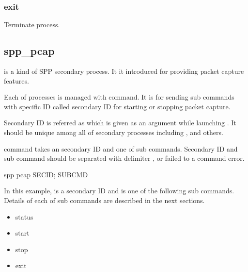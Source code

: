 \documentclass[a4paper,11pt,openany,oneside,english]{sphinxmanual}
\begin{document}
\subsubsection{exit}
\label{\detokenize{commands/secondary/spp_mirror:exit}}
Terminate  process.

\begin{sphinxVerbatim}[commandchars=\\\{\},formatcom=\footnotesize]
\end{sphinxVerbatim}


\subsection{spp\_pcap}
\label{\detokenize{commands/secondary/spp_pcap:spp-pcap}}\label{\detokenize{commands/secondary/spp_pcap:commands-spp-pcap}}\label{\detokenize{commands/secondary/spp_pcap::doc}}
 is a kind of SPP secondary process. It it introduced for
providing packet capture features.

Each of  processes is managed with  command. It is for
sending sub commands with specific ID called secondary ID for starting or
stopping packet capture.

Secondary ID is referred as  which is given as an argument
while launching . It should be unique among all of secondary
processes including ,  and others.

 command takes an secondary ID and one of sub commands. Secondary ID
and sub command should be separated with delimiter \sphinxcode{\sphinxupquote{;}}, or failed to a
command error.

\begin{sphinxVerbatim}[commandchars=\\\{\},formatcom=\footnotesize]
spp \PYGZgt{} pcap SEC\PYGZus{}ID; SUB\PYGZus{}CMD
\end{sphinxVerbatim}

In this example,  is a secondary ID and  is one of the
following sub commands. Details of each of sub commands are described in the
next sections.
\begin{itemize}
\item {} 
status

\item {} 
start

\item {} 
stop

\item {} 
exit

\end{itemize}
\end{document}
